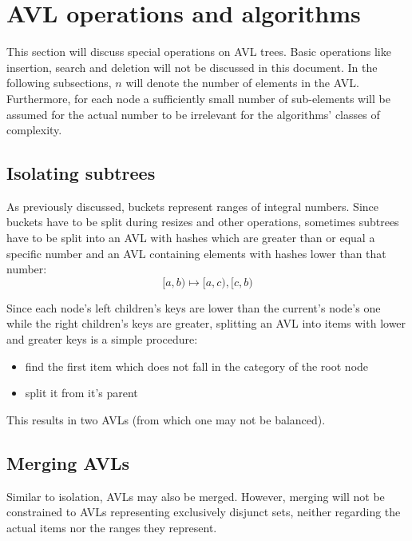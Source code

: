 \section{AVL operations and algorithms}
\label{sec:AVL_ops}

    This section will discuss special operations on AVL trees. Basic operations
    like insertion, search and deletion will not be discussed in this document.
    In the following subsections, $n$ will denote the number of elements in the
    AVL.
    Furthermore, for each node a sufficiently small number of sub-elements will
    be assumed for the actual number to be irrelevant for the algorithms'
    classes of complexity.

    \subsection{Isolating subtrees}
    \label{sec:AVL_ops-isolate}

        As previously discussed, buckets represent ranges of integral numbers.
        Since buckets have to be split during resizes and other operations,
        sometimes subtrees have to be split into an AVL with hashes which are
        greater than or equal a specific number and an AVL containing elements
        with hashes lower than that number:
        \begin{equation}
            [a,b) \mapsto [a,c), [c,b)
        \end{equation}

        Since each node's left children's keys are lower than the current's
        node's one while the right children's keys are greater, splitting an
        AVL into items with lower and greater keys is a simple procedure:
        \begin{itemize}
            \item find the first item which does not fall in the category of
                the root node
            \item split it from it's parent
        \end{itemize}
        This results in two AVLs (from which one may not be balanced).

    \subsection{Merging AVLs}
    \label{sec:AVL_ops-merge}

        Similar to isolation, AVLs may also be merged.
        However, merging will not be constrained to AVLs representing
        exclusively disjunct sets, neither regarding the actual items
        nor the ranges they represent.

